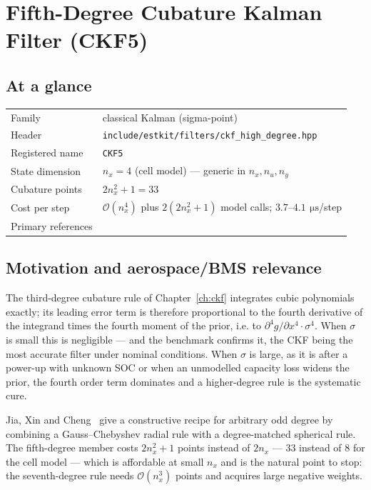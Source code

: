 \chapter{Fifth-Degree Cubature Kalman Filter (CKF5)}
\label{ch:ckf5}

\section*{At a glance}
\begin{tabular}{@{}l>{\raggedright\arraybackslash}p{}@{}}
Family & classical Kalman (sigma-point) \\
Header & \texttt{include/estkit/filters/ckf\_high\_degree.hpp} \\
Registered name & \texttt{CKF5} \\
State dimension & $n_x = 4$ (cell model) --- generic in $n_x, n_u, n_y$ \\
Cubature points & $2n_x^2+1 = 33$ \\
Cost per step & $\mathcal{O}(n_x^4)$ plus $2(2n_x^2{+}1)$ model calls; $3.7$--$4.1\,\SI{}{\micro\second}$/step \\
Primary references & \cite{jia2013highdegree,arasaratnam2009ckf,stroud1971} \\
\end{tabular}

\section{Motivation and aerospace/BMS relevance}
The third-degree cubature rule of Chapter~\ref{ch:ckf} integrates cubic polynomials exactly;
its leading error term is therefore proportional to the fourth derivative of the integrand
times the fourth moment of the prior, i.e. to $\partial^4 g/\partial x^4 \cdot \sigma^4$.
When $\sigma$ is small this is negligible --- and the benchmark confirms it, the CKF being the
most accurate filter under nominal conditions. When $\sigma$ is large, as it is after a
power-up with unknown SOC or when an unmodelled capacity loss widens the prior, the fourth
order term dominates and a higher-degree rule is the systematic cure.

Jia, Xin and Cheng~\cite{jia2013highdegree} give a constructive recipe for arbitrary odd
degree by combining a Gauss--Chebyshev radial rule with a degree-matched spherical rule. The
fifth-degree member costs $2n_x^2+1$ points instead of $2n_x$ --- $33$ instead of $8$ for the
cell model --- which is affordable at small $n_x$ and is the natural point to stop: the
seventh-degree rule needs $\mathcal{O}(n_x^3)$ points and acquires large negative weights.

